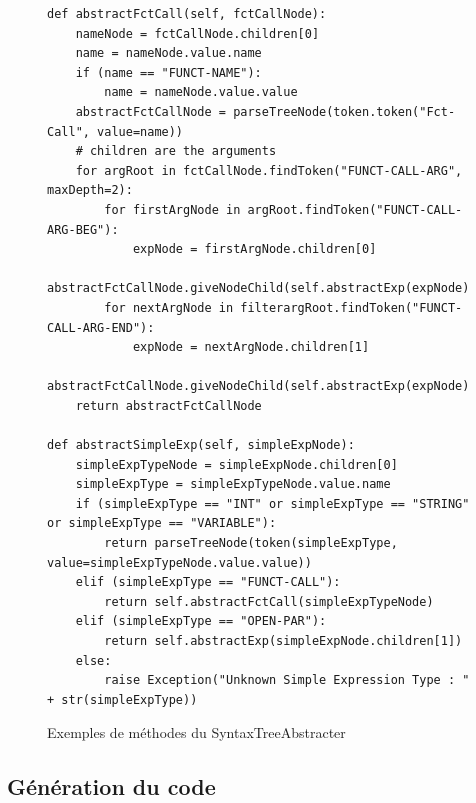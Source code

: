 \documentclass[a4paper,10pt]{article}
\begin{document}
\begin{figure}[H]
\begin{lstlisting}
def abstractFctCall(self, fctCallNode):
	nameNode = fctCallNode.children[0]
	name = nameNode.value.name
	if (name == "FUNCT-NAME"):
		name = nameNode.value.value
	abstractFctCallNode = parseTreeNode(token.token("Fct-Call", value=name))
	# children are the arguments
	for argRoot in fctCallNode.findToken("FUNCT-CALL-ARG", maxDepth=2):
		for firstArgNode in argRoot.findToken("FUNCT-CALL-ARG-BEG"):
			expNode = firstArgNode.children[0]
			abstractFctCallNode.giveNodeChild(self.abstractExp(expNode))
		for nextArgNode in filterargRoot.findToken("FUNCT-CALL-ARG-END"):
			expNode = nextArgNode.children[1]
			abstractFctCallNode.giveNodeChild(self.abstractExp(expNode))
	return abstractFctCallNode

def abstractSimpleExp(self, simpleExpNode):
	simpleExpTypeNode = simpleExpNode.children[0]
	simpleExpType = simpleExpTypeNode.value.name
	if (simpleExpType == "INT" or simpleExpType == "STRING" or simpleExpType == "VARIABLE"):
		return parseTreeNode(token(simpleExpType, value=simpleExpTypeNode.value.value))
	elif (simpleExpType == "FUNCT-CALL"):
		return self.abstractFctCall(simpleExpTypeNode)
	elif (simpleExpType == "OPEN-PAR"):
		return self.abstractExp(simpleExpNode.children[1])
	else:
		raise Exception("Unknown Simple Expression Type : " + str(simpleExpType))
\end{lstlisting}
\fontfamily{}
\caption{Exemples de méthodes du SyntaxTreeAbstracter}
\label{lst:ex_STA}
\end{figure}


\subsection{Génération du code}
\end{document}
